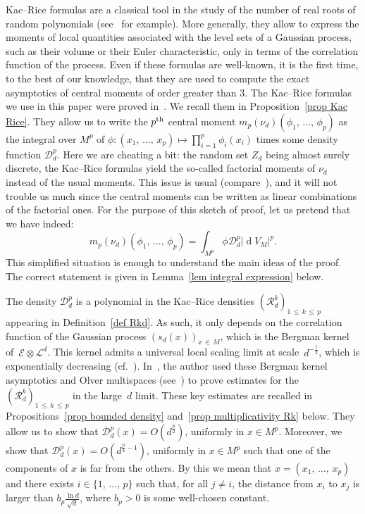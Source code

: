 \documentclass[10pt]{amsart}
\theoremstyle{definition}\newtheorem{defi}[theo]{Definition}\newtheorem{rema}[theo]{Remark}\newtheorem{exam}[theo]{Example}\newtheorem{exem}[theo]{Example}\newtheorem{nota}[theo]{Notation}
\DeclareMathOperator{\dmesure}{d}
\newcommand{\D}{\mathcal{D}}
\newcommand{\E}{\mathcal{E}}
\renewcommand{\L}{\mathcal{L}}
\newcommand{\clR}{\mathcal{R}}
\newcommand{\norm}[1]{\left\lvert #1 \right\rvert}
\newcommand{\rmes}[1]{\norm{\dmesure\! V_{#1}}}
\renewcommand{\leq}{\leqslant}
\begin{document}
Kac--Rice formulas are a classical tool in the study of the number of real roots of random polynomials (see~\cite{AT2007,AW2009} for example). More generally, they allow to express the moments of local quantities associated with the level sets of a Gaussian process, such as their volume or their Euler characteristic, only in terms of the correlation function of the process. Even if these formulas are well-known, it is the first time, to the best of our knowledge, that they are used to compute the exact asymptotics of central moments of order greater than $3$. The Kac--Rice formulas we use in this paper were proved in~\cite{Anc2019}. We recall them in Proposition~\ref{prop Kac Rice}. They allow us to write the $p^{\rm th}$ central moment $m_p(\nu_d)(\phi_1,\,\dots,\,\phi_p)$ as the integral over $M^p$ of $\phi:(x_1,\,\dots,\,x_p) \mapsto \prod_{i=1}^p \phi_i(x_i)$ times some density function $\D_d^p$. Here we are cheating a bit: the random set $Z_d$ being almost surely discrete, the Kac--Rice formulas yield the so-called factorial moments of $\nu_d$ instead of the usual moments. This issue is usual (compare~\cite{AT2007,AW2009}), and it will not trouble us much since the central moments can be written as linear combinations of the factorial ones. For the purpose of this sketch of proof, let us pretend that we have indeed:
\[
m_p(\nu_d)\left(\phi_1,\,\dots,\,\phi_p\right) = \int_{M^p} \phi \D_d^p \rmes{M}^p.
\]
This simplified situation is enough to understand the main ideas of the proof. The correct statement is given in Lemma~\ref{lem integral expression} below.

The density $\D_d^p$ is a polynomial in the Kac--Rice densities $(\clR^k_d)_{1 \,\leq\,k\,\leq\,p}$ appearing in Definition~\ref{def Rkd}. As such, it only depends on the correlation function of the Gaussian process $(s_d(x))_{x\,\in\, M}$, which is the Bergman kernel of~$\E \otimes \L^d$. This kernel admits a universal local scaling limit at scale~$d^{-\frac{1}{2}}$, which is exponentially decreasing (cf.~\cite{MM2007,MM2015}). In~\cite{Anc2019}, the author used these Bergman kernel asymptotics and Olver multispaces (see~\cite{Olv2001}) to prove estimates for the $(\clR^k_d)_{1\,\leq\,k\,\leq\,p}$ in the large~$d$ limit. These key estimates are recalled in Propositions~\ref{prop bounded density} and~\ref{prop multiplicativity Rk} below. They allow us to show that $\D_d^p(x) = O(d^\frac{p}{2})$, uniformly in $x \in M^p$. Moreover, we show that $\D_d^p(x) = O(d^{\frac{p}{4}-1})$, uniformly in $x \in M^p$ such that one of the components of $x$ is far from the others. By this we mean that $x =(x_1,\,\dots,\,x_p)$ and there exists $i \in \{1,\,\dots,\,p\}$ such that, for all $j \neq i$, the distance from $x_i$ to $x_j$ is larger than $b_p\frac{\ln d}{\sqrt{d}}$, where $b_p >0$ is some well-chosen constant.
\end{document}
